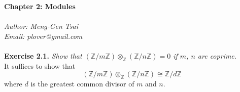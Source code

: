 \documentclass{article}
\begin{document}
\textbf{\Large Chapter 2: Modules} \\\\



\emph{Author: Meng-Gen Tsai} \\
\emph{Email: plover@gmail.com} \\\\






\textbf{Exercise 2.1.}
\emph{Show that
$(\mathbb{Z}/m\mathbb{Z}) \otimes_{\mathbb{Z}} (\mathbb{Z}/n\mathbb{Z}) = 0$
if $m$, $n$ are coprime.} \\

It suffices to show that
$$(\mathbb{Z}/m\mathbb{Z}) \otimes_{\mathbb{Z}} (\mathbb{Z}/n\mathbb{Z})
\cong \mathbb{Z}/d\mathbb{Z}$$
where $d$ is the greatest common divisor of $m$ and $n$. \\
\end{document}
